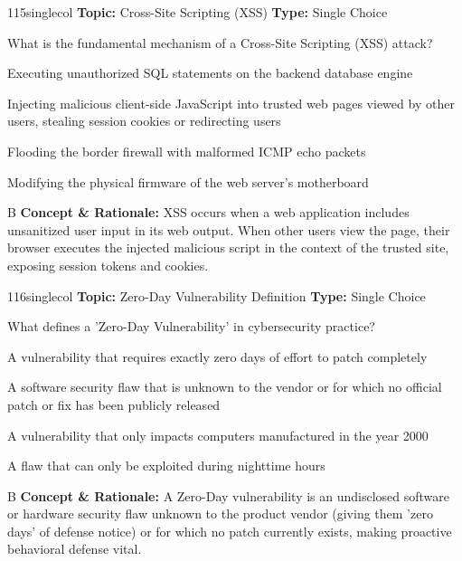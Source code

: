 \begin{qcard}{115}{singlecol}
\textcolor{darkslate!75}{\small\textbf{Topic:} Cross-Site Scripting (XSS) \hfill \textbf{Type:} Single Choice}\vspace{0.4em}\par
What is the fundamental mechanism of a Cross-Site Scripting (XSS) attack?
\begin{qoptions}
\item Executing unauthorized SQL statements on the backend database engine
\item Injecting malicious client-side JavaScript into trusted web pages viewed by other users, stealing session cookies or redirecting users
\item Flooding the border firewall with malformed ICMP echo packets
\item Modifying the physical firmware of the web server's motherboard
\end{qoptions}
\end{qcard}
\nopagebreak
\begin{explainbox}{B}
\textbf{Concept \& Rationale:} XSS occurs when a web application includes unsanitized user input in its web output. When other users view the page, their browser executes the injected malicious script in the context of the trusted site, exposing session tokens and cookies.
\end{explainbox}

\begin{qcard}{116}{singlecol}
\textcolor{darkslate!75}{\small\textbf{Topic:} Zero-Day Vulnerability Definition \hfill \textbf{Type:} Single Choice}\vspace{0.4em}\par
What defines a 'Zero-Day Vulnerability' in cybersecurity practice?
\begin{qoptions}
\item A vulnerability that requires exactly zero days of effort to patch completely
\item A software security flaw that is unknown to the vendor or for which no official patch or fix has been publicly released
\item A vulnerability that only impacts computers manufactured in the year 2000
\item A flaw that can only be exploited during nighttime hours
\end{qoptions}
\end{qcard}
\nopagebreak
\begin{explainbox}{B}
\textbf{Concept \& Rationale:} A Zero-Day vulnerability is an undisclosed software or hardware security flaw unknown to the product vendor (giving them 'zero days' of defense notice) or for which no patch currently exists, making proactive behavioral defense vital.
\end{explainbox}

